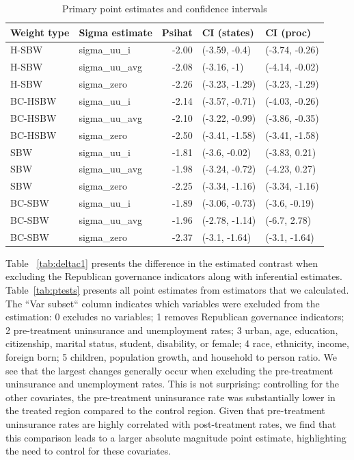 \documentclass[12pt]{article}
\begin{document}
\begin{table}[ht]
\centering
\begin{tabular}{llrll}
  \toprule
Weight type & Sigma estimate & Psihat & CI (states) & CI (proc) \\ 
  \midrule
H-SBW & sigma\_uu\_i & -2.00 & (-3.59, -0.4) & (-3.74, -0.26) \\ 
  H-SBW & sigma\_uu\_avg & -2.08 & (-3.16, -1) & (-4.14, -0.02) \\ 
  H-SBW & sigma\_zero & -2.26 & (-3.23, -1.29) & (-3.23, -1.29) \\ 
  BC-HSBW & sigma\_uu\_i & -2.14 & (-3.57, -0.71) & (-4.03, -0.26) \\ 
  BC-HSBW & sigma\_uu\_avg & -2.10 & (-3.22, -0.99) & (-3.86, -0.35) \\ 
  BC-HSBW & sigma\_zero & -2.50 & (-3.41, -1.58) & (-3.41, -1.58) \\ 
  SBW & sigma\_uu\_i & -1.81 & (-3.6, -0.02) & (-3.83, 0.21) \\ 
  SBW & sigma\_uu\_avg & -1.98 & (-3.24, -0.72) & (-4.23, 0.27) \\ 
  SBW & sigma\_zero & -2.25 & (-3.34, -1.16) & (-3.34, -1.16) \\ 
  BC-SBW & sigma\_uu\_i & -1.89 & (-3.06, -0.73) & (-3.6, -0.19) \\ 
  BC-SBW & sigma\_uu\_avg & -1.96 & (-2.78, -1.14) & (-6.7, 2.78) \\ 
  BC-SBW & sigma\_zero & -2.37 & (-3.1, -1.64) & (-3.1, -1.64) \\ 
   \bottomrule
\end{tabular}
\caption{Primary point estimates and confidence intervals}
\label{tab:confintmain}
\end{table}

Table ~\ref{tab:deltac1} presents the difference in the estimated contrast when excluding the Republican governance indicators along with inferential estimates. Table~\ref{tab:ptests} presents all point estimates from estimators that we calculated. The ``Var subset`` column indicates which variables were excluded from the estimation: 0 excludes no variables; 1 removes Republican governance indicators; 2 pre-treatment uninsurance and unemployment rates; 3 urban, age, education, citizenship, marital status, student, disability, or female; 4 race, ethnicity, income, foreign born; 5 children, population growth, and household to person ratio. We see that the largest changes generally occur when excluding the pre-treatment uninsurance and unemployment rates. This is not surprising: controlling for the other covariates, the pre-treatment uninsurance rate was substantially lower in the treated region compared to the control region. Given that pre-treatment uninsurance rates are highly correlated with post-treatment rates, we find that this comparison leads to a larger absolute magnitude point estimate, highlighting the need to control for these covariates.
\end{document}
